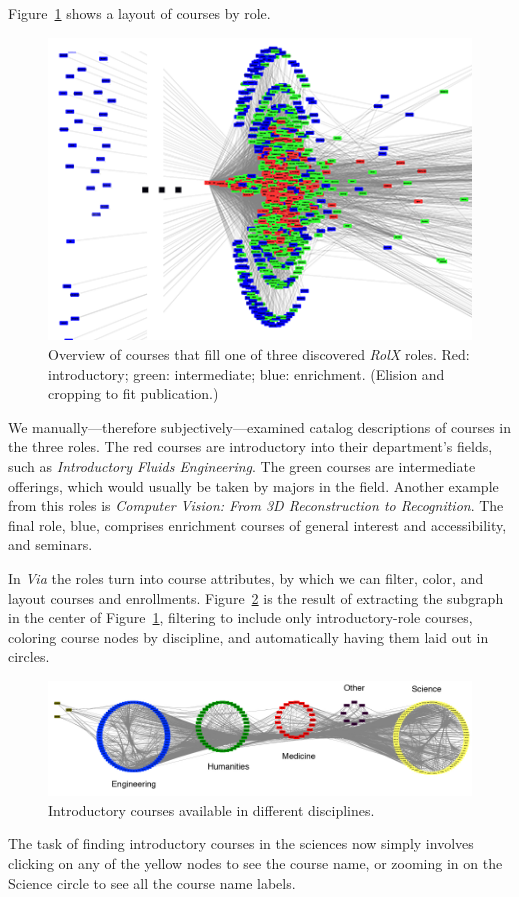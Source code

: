 Figure~\ref{fig:rolxOverview} shows a layout of courses by role.
\begin{figure}
    \centering
    \includegraphics{Figs/rolxOverviewCropped2PhotoshopCroppedDoctoredWhite.png}
    \caption{Overview of courses that fill one of three discovered
      {\em RolX} roles. Red: introductory; green: intermediate; blue:
      enrichment. (Elision and cropping to fit publication.)}
    \label{fig:rolxOverview}
\end{figure}
We manually---therefore subjectively---examined catalog descriptions
of courses in the three roles. The red courses are introductory into
their department's fields, such as {\em Introductory Fluids
  Engineering}. The green courses are intermediate offerings, which
would usually be taken by majors in the field. Another example from
this roles is {\em Computer Vision: From 3D Reconstruction to
  Recognition}. The final role, blue, comprises enrichment courses of
general interest and accessibility, and seminars.

In {\em Via} the roles turn into course attributes, by which we can
filter, color, and layout courses and
enrollments. Figure~\ref{fig:rolxIntroCourses} is the result of extracting
the subgraph in the center of Figure~\ref{fig:rolxOverview},
filtering to include only introductory-role courses, coloring course
nodes by discipline, and automatically having them laid out in
circles.
\begin{figure}
    \centering
    \includegraphics[width=\textwidth]{Figs/rolxIntroCoursesByDepartmentCropped.pdf}
    \caption{Introductory courses available in different disciplines.}
    \label{fig:rolxIntroCourses}
\end{figure}
The task of finding introductory courses in the sciences now simply
involves clicking on any of the yellow nodes to see the course name,
or zooming in on the Science circle to see all the course name labels.

